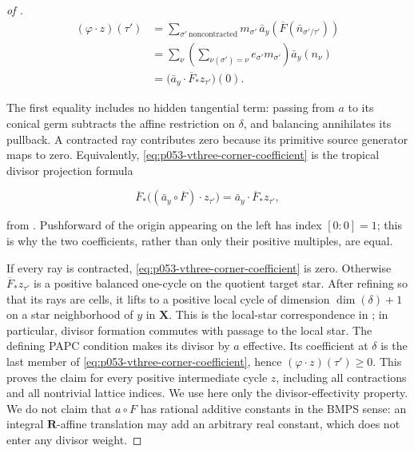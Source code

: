 \begin{proof}[of
]
\begin{align}
 (\varphi\cdot z)(\tau')
 &=\sum_{\sigma'\ \mathrm{noncontracted}}
      m_{\sigma'}\,
      \bar a_y\!\left(
         \overline F(\bar n_{\sigma'/\tau'})
      \right) \\
 &=\sum_\nu
      \left(\sum_{\nu(\sigma')=\nu}
         e_{\sigma'}m_{\sigma'}\right)\bar a_y(n_\nu) \\
 &=\bigl(\bar a_y\cdot\overline F_*z_{\tau'}\bigr)(0).
 \label{eq:p053-vthree-corner-coefficient}
\end{align}

The first equality includes no hidden tangential term: passing from \(a\) to
its conical germ subtracts the affine restriction on \(\delta\), and balancing
annihilates its pullback.  A contracted ray contributes zero because its
primitive source generator maps to zero.  Equivalently,
\eqref{eq:p053-vthree-corner-coefficient} is the tropical divisor projection
formula

\begin{equation}
 \overline F_*\bigl(
   (\bar a_y\circ\overline F)\cdot z_{\tau'}
 \bigr)
 =\bar a_y\cdot\overline F_*z_{\tau'},
 \label{eq:p053-vthree-local-projection}
\end{equation}

from \cite[Proposition~1.13]{GK17}.  Pushforward of the origin appearing on
the left has index \([0:0]=1\); this is why the two coefficients, rather than
only their positive multiples, are equal.

If every ray is contracted, \eqref{eq:p053-vthree-corner-coefficient} is
zero.  Otherwise \(\overline F_*z_{\tau'}\) is a positive balanced
one-cycle on the quotient target star.  After refining so that its rays are
cells, it lifts to a positive local cycle of dimension
\(\dim(\delta)+1\) on a star neighborhood of \(y\) in \(\mathbf X\).
This is the local-star correspondence in
\cite[Definitions~2.22--2.23 and Lemmas~2.24 and~2.35]{BMPS26}; in
particular, divisor formation commutes with passage to the local star.  The
defining PAPC condition
\cite[Definition~3.1]{BMPS26} makes its divisor by \(a\) effective.  Its
coefficient at \(\delta\) is the last member of
\eqref{eq:p053-vthree-corner-coefficient}, hence
\((\varphi\cdot z)(\tau')\geq0\).  This proves the claim for every positive
intermediate cycle \(z\), including all contractions and all nontrivial
lattice indices.  We use here only the divisor-effectivity property.  We do
not claim that \(a\circ F\) has rational additive constants in the BMPS
sense: an integral \(\mathbf R\)-affine translation may add an arbitrary real
constant, which does not enter any divisor weight.


\end{proof}
